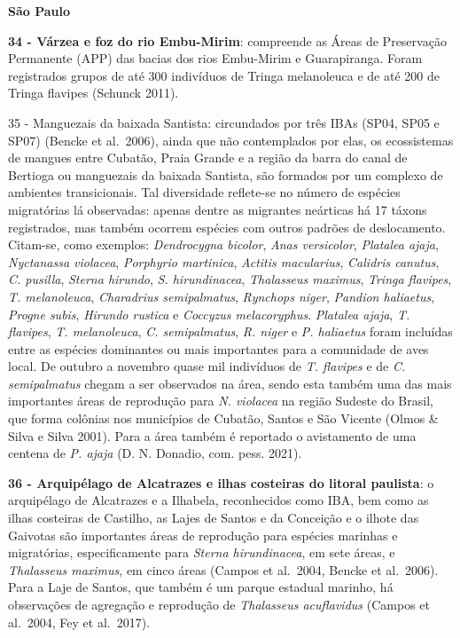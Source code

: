\documentclass[
  oneside]{scrbook}
\begin{document}
\textbf{São Paulo}

\textbf{34 - Várzea e foz do rio Embu-Mirim}: compreende as Áreas de Preservação Permanente (APP) das bacias dos rios Embu-Mirim e Guarapiranga. Foram registrados grupos de até 300 indivíduos de Tringa melanoleuca e de até 200 de Tringa flavipes (Schunck 2011).

35 - Manguezais da baixada Santista: circundados por três IBAs (SP04, SP05 e SP07) (Bencke et al.~2006), ainda que não contemplados por elas, os ecossistemas de mangues entre Cubatão, Praia Grande e a região da barra do canal de Bertioga ou manguezais da baixada Santista, são formados por um complexo de ambientes transicionais. Tal diversidade reflete-se no número de espécies migratórias lá observadas: apenas dentre as migrantes neárticas há 17 táxons registrados, mas também ocorrem espécies com outros padrões de deslocamento. Citam-se, como exemplos: \emph{Dendrocygna bicolor}, \emph{Anas versicolor}, \emph{Platalea ajaja}, \emph{Nyctanassa violacea}, \emph{Porphyrio martinica}, \emph{Actitis macularius}, \emph{Calidris canutus}, \emph{C. pusilla}, \emph{Sterna hirundo}, \emph{S. hirundinacea}, \emph{Thalasseus maximus}, \emph{Tringa flavipes}, \emph{T. melanoleuca}, \emph{Charadrius semipalmatus}, \emph{Rynchops niger}, \emph{Pandion haliaetus}, \emph{Progne subis}, \emph{Hirundo rustica} e \emph{Coccyzus melacoryphus}. \emph{Platalea ajaja}, \emph{T. flavipes}, \emph{T. melanoleuca}, \emph{C. semipalmatus}, \emph{R. niger} e \emph{P. haliaetus} foram incluídas entre as espécies dominantes ou mais importantes para a comunidade de aves local. De outubro a novembro quase mil indivíduos de \emph{T. flavipes} e de \emph{C. semipalmatus} chegam a ser observados na área, sendo esta também uma das mais importantes áreas de reprodução para \emph{N. violacea} na região Sudeste do Brasil, que forma colônias nos municípios de Cubatão, Santos e São Vicente (Olmos \& Silva e Silva 2001). Para a área também é reportado o avistamento de uma centena de \emph{P. ajaja} (D. N. Donadio, com. pess. 2021).

\textbf{36 - Arquipélago de Alcatrazes e ilhas costeiras do litoral paulista}: o arquipélago de Alcatrazes e a Ilhabela, reconhecidos como IBA, bem como as ilhas costeiras de Castilho, as Lajes de Santos e da Conceição e o ilhote das Gaivotas são importantes áreas de reprodução para espécies marinhas e migratórias, especificamente para \emph{Sterna hirundinacea}, em sete áreas, e \emph{Thalasseus maximus}, em cinco áreas (Campos et al.~2004, Bencke et al.~2006). Para a Laje de Santos, que também é um parque estadual marinho, há observações de agregação e reprodução de \emph{Thalasseus acuflavidus} (Campos et al.~2004, Fey et al.~2017).
\end{document}
